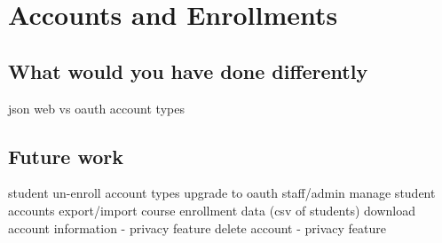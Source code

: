 \section{Accounts and Enrollments}

\subsection{What would you have done differently}
json web vs oauth
account types

\subsection{Future work}
student un-enroll
account types
upgrade to oauth
staff/admin manage student accounts
export/import course enrollment data (csv of students)
download account information - privacy feature
delete account - privacy feature